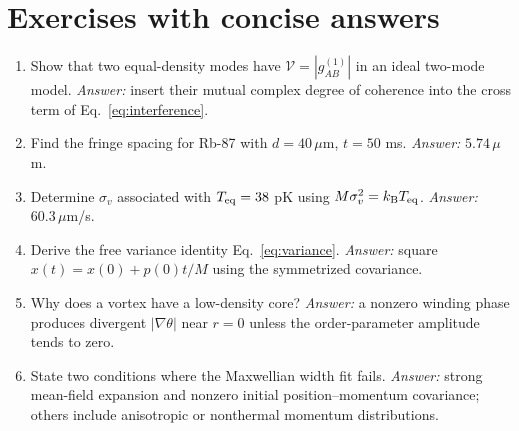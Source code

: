 \documentclass[11pt,a4paper]{article}
\newcommand{\kb}{k_{\mathrm B}}
\begin{document}
\section{Exercises with concise answers}
\begin{enumerate}[leftmargin=*,itemsep=5pt]
\item Show that two equal-density modes have $\mathcal V=|g_{AB}^{(1)}|$ in an ideal two-mode model. \emph{Answer:} insert their mutual complex degree of coherence into the cross term of Eq.~\eqref{eq:interference}.
\item Find the fringe spacing for Rb-87 with $d=40\,\mu$m, $t=50$ ms. \emph{Answer:} $5.74\,\mu$m.
\item Determine $\sigma_v$ associated with $T_{\rm eq}=38$ pK using $M\sigma_v^2=\kb T_{\rm eq}$. \emph{Answer:} $60.3\,\mu$m/s.
\item Derive the free variance identity Eq.~\eqref{eq:variance}. \emph{Answer:} square $x(t)=x(0)+p(0)t/M$ using the symmetrized covariance.
\item Why does a vortex have a low-density core? \emph{Answer:} a nonzero winding phase produces divergent $|\nabla\theta|$ near $r=0$ unless the order-parameter amplitude tends to zero.
\item State two conditions where the Maxwellian width fit fails. \emph{Answer:} strong mean-field expansion and nonzero initial position--momentum covariance; others include anisotropic or nonthermal momentum distributions.
\end{enumerate}
\end{document}
